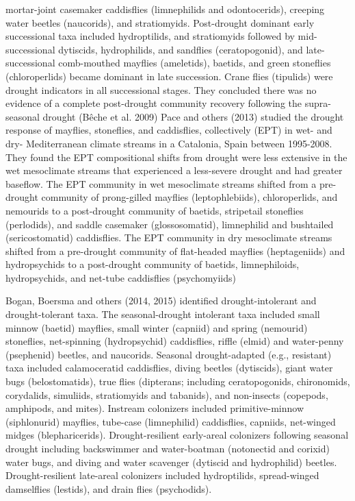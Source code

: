 \documentclass[12pt,twoside]{reedthesis}
\theoremstyle{definition}
\theoremstyle{definition}
\theoremstyle{definition}
\theoremstyle{remark}
\begin{document}
mortar-joint casemaker caddisflies (limnephilids and odontocerids),
creeping water beetles (naucorids), and stratiomyids. Post-drought
dominant early successional taxa included hydroptilids, and stratiomyids
followed by mid-successional dytiscids, hydrophilids, and sandflies
(ceratopogonid), and late-successional comb-mouthed mayflies
(ameletids), baetids, and green stoneflies (chloroperlids) became
dominant in late succession. Crane flies (tipulids) were drought
indicators in all successional stages. They concluded there was no
evidence of a complete post-drought community recovery following the
supra-seasonal drought (Bêche et al. 2009) Pace and others (2013)
studied the drought response of mayflies, stoneflies, and caddisflies,
collectively (EPT) in wet- and dry- Mediterranean climate streams in a
Catalonia, Spain between 1995-2008. They found the EPT compositional
shifts from drought were less extensive in the wet mesoclimate streams
that experienced a less-severe drought and had greater baseflow. The EPT
community in wet mesoclimate streams shifted from a pre-drought
community of prong-gilled mayflies (leptophlebiids), chloroperlids, and
nemourids to a post-drought community of baetids, stripetail stoneflies
(perlodids), and saddle casemaker (glossosomatid), limnephilid and
bushtailed (sericostomatid) caddisflies. The EPT community in dry
mesoclimate streams shifted from a pre-drought community of flat-headed
mayflies (heptageniids) and hydropsychids to a post-drought community of
baetids, limnephiloids, hydropsychids, and net-tube caddisflies
(psychomyiids)

Bogan, Boersma and others (2014, 2015) identified drought-intolerant and
drought-tolerant taxa. The seasonal-drought intolerant taxa included
small minnow (baetid) mayflies, small winter (capniid) and spring
(nemourid) stoneflies, net-spinning (hydropsychid) caddisflies, riffle
(elmid) and water-penny (psephenid) beetles, and naucorids. Seasonal
drought-adapted (e.g., resistant) taxa included calamoceratid
caddisflies, diving beetles (dytiscids), giant water bugs
(belostomatids), true flies (dipterans; including ceratopogonids,
chironomids, corydalids, simuliids, stratiomyids and tabanids), and
non-insects (copepods, amphipods, and mites). Instream colonizers
included primitive-minnow (siphlonurid) mayflies, tube-case
(limnephilid) caddisflies, capniids, net-winged midges (blepharicerids).
Drought-resilient early-areal colonizers following seasonal drought
including backswimmer and water-boatman (notonectid and corixid) water
bugs, and diving and water scavenger (dytiscid and hydrophilid) beetles.
Drought-resilient late-areal colonizers included hydroptilids,
spread-winged damselflies (lestids), and drain flies (psychodids).
\end{document}
